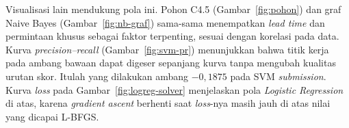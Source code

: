 Visualisasi lain mendukung pola ini. Pohon C4.5 (Gambar~\ref{fig:pohon})
dan graf Naive Bayes (Gambar~\ref{fig:nb-graf}) sama-sama menempatkan
\textit{lead time} dan permintaan khusus sebagai faktor terpenting, sesuai
dengan korelasi pada data. Kurva \textit{precision--recall}
(Gambar~\ref{fig:svm-pr}) menunjukkan bahwa titik kerja pada ambang
bawaan dapat digeser sepanjang kurva tanpa mengubah kualitas urutan skor.
Itulah yang dilakukan ambang $-0{,}1875$ pada SVM \textit{submission}. Kurva
\textit{loss} pada Gambar~\ref{fig:logreg-solver} menjelaskan pola
\textit{Logistic Regression} di atas, karena \textit{gradient ascent}
berhenti saat \textit{loss}-nya masih jauh di atas nilai yang dicapai
L-BFGS.
